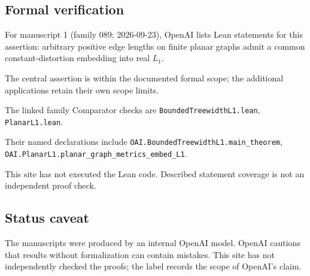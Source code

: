 \documentclass[11pt]{article}
\begin{document}
\subsection{Formal verification}
For manuscript 1 (family 089; 2026-09-23), OpenAI lists Lean statements for this assertion: arbitrary positive edge lengths on finite planar graphs admit a common constant-distortion embedding into real $L_1$.

The central assertion is within the documented formal scope; the additional applications retain their own scope limits.

The linked family Comparator checks are \texttt{BoundedTreewidthL1.lean}, \texttt{PlanarL1.lean}.

Their named declarations include \texttt{OAI.BoundedTreewidthL1.main\_theorem}, \texttt{OAI.PlanarL1.planar\_graph\_metrics\_embed\_L1}.

This site has not executed the Lean code. Described statement coverage is not an independent proof check.

\subsection{Status caveat}
The manuscripts were produced by an internal OpenAI model. OpenAI cautions that results without formalization can contain mistakes. This site has not independently checked the proofs; the label records the scope of OpenAI's claim.
\end{document}
